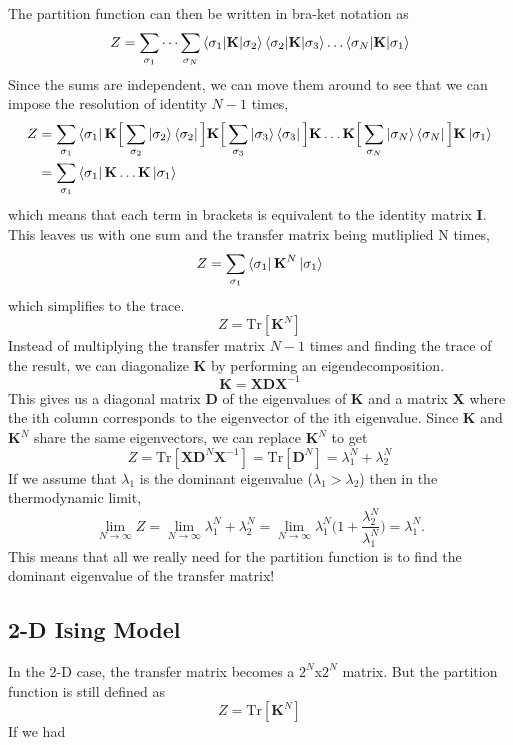 \documentclass{article}
\newcommand{\be}{\begin{equation}}
\newcommand{\ee}{\end{equation}}
\newcommand{\tk}{\textbf{K}}
\newcommand{\ti}{\textbf{I}}
\begin{document}
The partition function can then be written in bra-ket notation as
\be
  Z = \sum_{\sigma_1} \dots \sum_{\sigma_N} \braket{\sigma_1 | \tk | \sigma_2} \braket{\sigma_2 | \tk | \sigma_3} \dots \braket{\sigma_N | \tk | \sigma_1}
\ee
Since the sums are independent, we can move them around to see that we can impose the resolution of identity $N - 1$ times,
\be
  \begin{split}
    Z &= \sum_{\sigma_1} \bra{\sigma_1} \tk \Big[ \sum_{\sigma_2} \ket{\sigma_2} \bra{\sigma_2} \Big] \tk \Big[ \sum_{\sigma_3} \ket{\sigma_3} \bra{\sigma_3} \Big] \tk \dots \tk \Big[ \sum_{\sigma_N} \ket{\sigma_N} \bra{\sigma_N} \Big] \tk \ket{\sigma_1} \\
    &= \sum_{\sigma_1} \bra{\sigma_1} \tk \dots \tk \ket{\sigma_1}
  \end{split}
\ee
which means that each term in brackets is equivalent to the identity matrix \ti.
This leaves us with one sum and the transfer matrix being mutliplied N times,
\be
  Z = \sum_{\sigma_1} \bra{\sigma_1} \tk^N \ket{\sigma_1}
\ee
which simplifies to the trace.
\be
  Z = \text{Tr}[\tk^N]
\ee
Instead of multiplying the transfer matrix $N - 1$ times and finding the trace of the result, we can diagonalize \textbf{K} by performing an eigendecomposition.
\be
  \tk = \textbf{X} \textbf{D} \textbf{X}^{-1}
\ee
This gives us a diagonal matrix \textbf{D} of the eigenvalues of \textbf{K} and a matrix \textbf{X} where the ith column corresponds to the eigenvector of the ith eigenvalue.
Since \textbf{K} and $\tk^N$ share the same eigenvectors, we can replace $\tk^N$ to get
\be
  Z = \text{Tr}[\textbf{X} \textbf{D}^N \textbf{X}^{-1}] = \text{Tr}[\textbf{D}^N] = \lambda_1^N + \lambda_2^N
\ee
If we assume that $\lambda_1$ is the dominant eigenvalue ($\lambda_1 > \lambda_2$) then in the thermodynamic limit,
\be
  \lim_{N \to \infty} Z = \lim_{N \to \infty} \lambda_1^N + \lambda_2^N = \lim_{N \to \infty} \lambda_1^N \Big(1 + \frac{\lambda_2^N}{\lambda_1^N} \Big)  = \lambda_1^N .
\ee
This means that all we really need for the partition function is to find the dominant eigenvalue of the transfer matrix!

\subsection{2-D Ising Model}
In the 2-D case, the transfer matrix becomes a $2^N$x$2^N$ matrix.
But the partition function is still defined as
\be
  Z = \text{Tr}[ \tk^N ]
\ee
If we had


\end{document}

